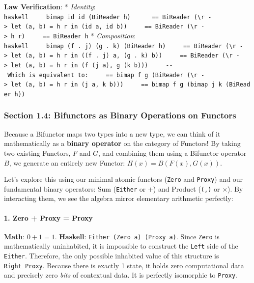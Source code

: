 \documentclass[
]{article}
\begin{document}
\textbf{Law Verification}: * \emph{Identity}:
\texttt{haskell\ \ \ \ \ bimap\ id\ id\ (BiReader\ h)\ \ \ \ \ \ ==\ BiReader\ (\textbackslash{}r\ -\textgreater{}\ let\ (a,\ b)\ =\ h\ r\ in\ (id\ a,\ id\ b))\ \ \ \ \ ==\ BiReader\ (\textbackslash{}r\ -\textgreater{}\ h\ r)\ \ \ \ \ ==\ BiReader\ h}
* \emph{Composition}:
\texttt{haskell\ \ \ \ \ bimap\ (f\ .\ j)\ (g\ .\ k)\ (BiReader\ h)\ \ \ \ \ ==\ BiReader\ (\textbackslash{}r\ -\textgreater{}\ let\ (a,\ b)\ =\ h\ r\ in\ ((f\ .\ j)\ a,\ (g\ .\ k)\ b))\ \ \ \ \ ==\ BiReader\ (\textbackslash{}r\ -\textgreater{}\ let\ (a,\ b)\ =\ h\ r\ in\ (f\ (j\ a),\ g\ (k\ b)))\ \ \ \ \ -\/-\ Which\ is\ equivalent\ to:\ \ \ \ \ ==\ bimap\ f\ g\ (BiReader\ (\textbackslash{}r\ -\textgreater{}\ let\ (a,\ b)\ =\ h\ r\ in\ (j\ a,\ k\ b)))\ \ \ \ \ ==\ bimap\ f\ g\ (bimap\ j\ k\ (BiReader\ h))}

\subsubsection{Section 1.4: Bifunctors as Binary Operations on
Functors}\label{section-1.4-bifunctors-as-binary-operations-on-functors}

Because a Bifunctor maps two types into a new type, we can think of it
mathematically as a \textbf{binary operator} on the category of
Functors! By taking two existing Functors, \(F\) and \(G\), and
combining them using a Bifunctor operator \(B\), we generate an entirely
new Functor: \(H(x) = B(F(x), G(x))\).

Let's explore this using our minimal atomic functors (\texttt{Zero} and
\texttt{Proxy}) and our fundamental binary operators: Sum
(\texttt{Either} or \(+\)) and Product (\texttt{(,)} or \(\times\)). By
interacting them, we see the algebra mirror elementary arithmetic
perfectly:

\paragraph{1. Zero + Proxy = Proxy}\label{zero-proxy-proxy}

\textbf{Math}: \(0 + 1 = 1\). \textbf{Haskell}:
\texttt{Either\ (Zero\ a)\ (Proxy\ a)}. Since \texttt{Zero} is
mathematically uninhabited, it is impossible to construct the
\texttt{Left} side of the \texttt{Either}. Therefore, the only possible
inhabited value of this structure is \texttt{Right\ Proxy}. Because
there is exactly 1 state, it holds zero computational data and precisely
zero \emph{bits} of contextual data. It is perfectly isomorphic to
\texttt{Proxy}.
\end{document}
